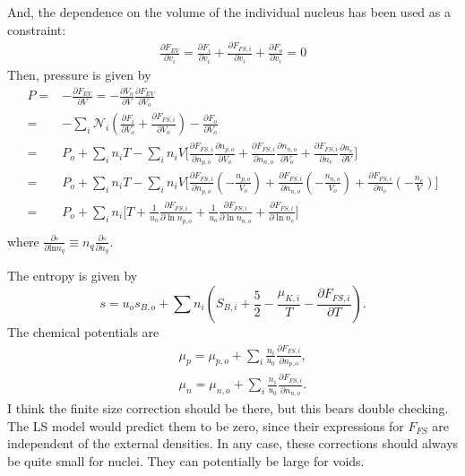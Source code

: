 \documentclass[11pt,letter]{article}
\begin{document}
And, the dependence on the volume of the individual nucleus has been used as a constraint:
\begin{equation}
 \begin{split}
  \frac{\partial F_{EV}}{\partial v_i}=\frac{\partial F_i}{\partial v_i} + \frac{\partial F_{FS,i}}{\partial v_i} + \frac{\partial F_o}{\partial v_i} = 0
 \end{split}
\end{equation}
Then, pressure is given by
\begin{equation}
 \begin{split}
  P =& -\frac{\partial F_{EV}}{\partial V} =-\frac{\partial V_o}{\partial V}\frac{\partial F_{EV}}{\partial V_o}\\
  =& -\sum_i \mathcal{N}_i (\frac{\partial F_i}{\partial V_o}+\frac{\partial F_{FS,i}}{\partial V_o})-\frac{\partial F_o}{\partial V_o}\\
  =& P_o+\sum_i n_i T -\sum_i n_i V \Big [\frac{\partial F_{FS,i}}{\partial n_{p,o}} \frac{\partial n_{p,o}}{\partial V_o}+\frac{\partial F_{FS,i}}{\partial n_{n,o}} \frac{\partial n_{n,o}}{\partial V_o}+\frac{\partial F_{FS,i}}{\partial n_{e}} \frac{\partial n_{e}}{\partial V}\Big]\\
  =& P_o+\sum_i n_i T -\sum_i n_i V \Big [\frac{\partial F_{FS,i}}{\partial n_{p,o}} (-\frac{n_{p,o}}{V_o})+\frac{\partial F_{FS,i}}{\partial n_{n,o}} (-\frac{n_{n,o}}{V_o})+\frac{\partial F_{FS,i}}{\partial n_{e}} (-\frac{n_{e}}{V})\Big]\\
  =&P_o +\sum_i n_i \Big [T+\frac{1}{u_o} \frac{\partial F_{FS,i}}{\partial \ln n_{p,o}}+\frac{1}{u_o}\frac{\partial F_{FS,i}}{\partial \ln n_{n,o}}+\frac{\partial F_{FS,i}}{\partial \ln n_{e}}\Big ]\\
 \end{split}
\end{equation}
where $\frac{\partial \square }{\partial \text{ln}n_q } \equiv n_q \frac{\partial \square }{\partial n_q }$.

The entropy is given by 
\begin{equation}
s = u_o s_{B,o} + \sum n_i \left(S_{B,i} + \frac{5}{2} - \frac{\mu_{K,i}}{T} 
- \frac{\partial F_{FS,i}}{\partial T}\right).
\end{equation}
The chemical potentials are 
\begin{eqnarray}
&& \mu_p = \mu_{p,o} + \sum_i \frac{n_i}{u_0} \frac{\partial F_{FS,i}}{\partial n_{p,o}}, \\
&& \mu_n = \mu_{n,o} + \sum_i \frac{n_i}{u_0} \frac{\partial F_{FS,i}}{\partial n_{n,o}}.
\end{eqnarray}
I think the finite size correction should be there, but this bears double
checking.  The LS model would predict them to be zero, since their expressions for
$F_{FS}$ are independent of the external densities.  In any case, these 
corrections should always be quite small for nuclei.  They can potentially be 
large for voids.
\end{document}
